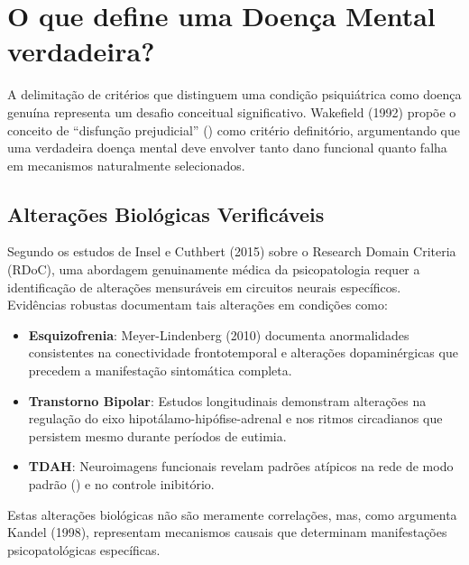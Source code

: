 \section{O que define uma Doença Mental verdadeira?}
\label{sec:definicao-doenca}

A delimitação de critérios que distinguem uma condição psiquiátrica como doença genuína representa um desafio conceitual significativo. Wakefield (1992) propõe o conceito de \enquote{disfunção prejudicial} () como critério definitório, argumentando que uma verdadeira doença mental deve envolver tanto dano funcional quanto falha em mecanismos naturalmente selecionados.

\subsection{Alterações Biológicas Verificáveis}

Segundo os estudos de Insel e Cuthbert (2015) sobre o Research Domain Criteria (RDoC), uma abordagem genuinamente médica da psicopatologia requer a identificação de alterações mensuráveis em circuitos neurais específicos. Evidências robustas documentam tais alterações em condições como:

\begin{itemize}
\item \textbf{Esquizofrenia}: Meyer-Lindenberg (2010) documenta anormalidades consistentes na conectividade frontotemporal e alterações dopaminérgicas que precedem a manifestação sintomática completa.

\item \textbf{Transtorno Bipolar}: Estudos longitudinais demonstram alterações na regulação do eixo hipotálamo-hipófise-adrenal e nos ritmos circadianos que persistem mesmo durante períodos de eutimia.

\item \textbf{TDAH}: Neuroimagens funcionais revelam padrões atípicos na rede de modo padrão () e no controle inibitório.
\end{itemize}

Estas alterações biológicas não são meramente correlações, mas, como argumenta Kandel (1998), representam mecanismos causais que determinam manifestações psicopatológicas específicas.

